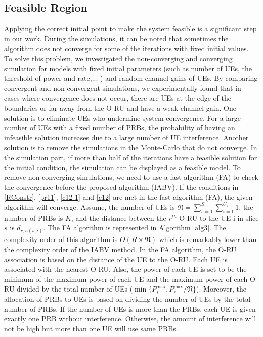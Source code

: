 \documentclass[lettersize,journal]{IEEEtran}
\begin{document}
\subsection{Feasible Region}\label{fr}
Applying the correct initial point to make the system feasible is a significant step in our work.
During the simulations, it can be noted that sometimes the algorithm does not converge for some of the iterations with fixed initial values.
To solve this problem, we investigated the non-converging and converging simulation for models with fixed initial parameters (such as number of UEs, the threshold of power and rate,... ) and random channel gains of UEs.
By comparing convergent and non-convergent simulations, we experimentally found that in cases where convergence does not occur, there are UEs at the edge of the boundaries or far away from the O-RU and have a weak channel gain. One solution is to eliminate UEs who undermine system convergence.
For a large number of UEs with a fixed number of PRBs, the probability of having an infeasible solution increases due to a large number of UE interference.
Another solution is to remove the simulations in the Monte-Carlo that do not converge.
In the simulation part, if more than half of the iterations have a feasible solution for the initial condition, the simulation can be displayed as a feasible model.
To remove non-converging simulations, we need to use a fast algorithm (FA) to check the convergence before
the proposed algorithm (IABV). 
If the conditions in \eqref{RConstr}, \eqref{pr11}, \eqref{c12-1} and \eqref{c12} are met in the fast algorithm (FA), the given algorithm will converge.
Assume, the number of UEs is $\mathfrak{N} = \sum_{s=1}^{S}\sum_{i=1}^{U_s}1$,
the number of PRBs is $K$, and the distance between the $r^{th}$ O-RU to the UE i in slice $s$ is $d_{r,u(s,i)}$.
The FA algorithm is represented in Algorithm \ref{alg3}.
The complexity order of this algorithm is $O(R\times \mathfrak{N})$ which is remarkably lower than the complexity order of the IABV method.
In the FA algorithm, the O-RU association is based on the distance of the UE to the O-RU. 
Each UE is associated with the nearest O-RU. Also, the power of each UE is set to be the minimum of the maximum power of each UE and the maximum power of each O-RU divided by the total number of UEs ($\min\{P_s^{\max}, P_r^{\max}/\mathfrak{N}\}$).
Moreover, the allocation of PRBs to UEs is based on dividing the number of UEs by the total number of PRBs.
If the number of UEs is more than the PRBs, each UE is given exactly one PRB without interference. Otherwise, the amount of interference will not be high but more than one UE will use same PRBs.
\vspace*{-1.7em}
\end{document}
